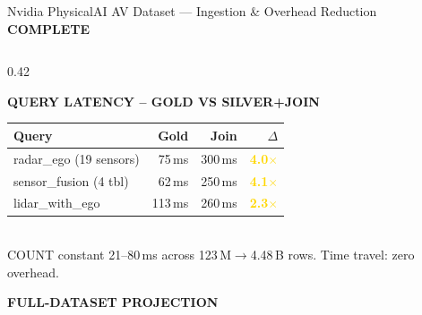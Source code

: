 \documentclass[aspectratio=169,11pt]{beamer}
\begin{document}
\begin{frame}{Nvidia PhysicalAI AV Dataset --- Ingestion \& Overhead Reduction
  \hfill\colorbox{good!20}{\scriptsize\textcolor{good}{\textbf{COMPLETE}}}}
\begin{columns}[T]
\begin{column}{0.42\textwidth}

\vspace{4pt}
{\footnotesize\textbf{\textcolor{accent}{QUERY LATENCY -- GOLD VS SILVER+JOIN}}}\\[2pt]
{\scriptsize
\begin{tabular}{@{}lrrr@{}}
\toprule
Query & Gold & Join & $\Delta$ \\
\midrule
radar\_ego (19 sensors) & 75\,ms & 300\,ms & \textbf{\textcolor{gold}{4.0$\times$}} \\
sensor\_fusion (4 tbl) & 62\,ms & 250\,ms & \textbf{\textcolor{gold}{4.1$\times$}} \\
lidar\_with\_ego & 113\,ms & 260\,ms & \textbf{\textcolor{gold}{2.3$\times$}} \\
\bottomrule
\end{tabular}
}\\[1pt]
{\tiny\color{muted} COUNT constant 21--80\,ms across 123\,M$\to$4.48\,B rows. Time travel: zero overhead.}

\vspace{4pt}
{\footnotesize\textbf{\textcolor{accent}{FULL-DATASET PROJECTION}}}\\[2pt]
\centering
{\scriptsize
{} \;
 \;
}

\end{column}
\end{columns}

\end{frame}
\end{document}
